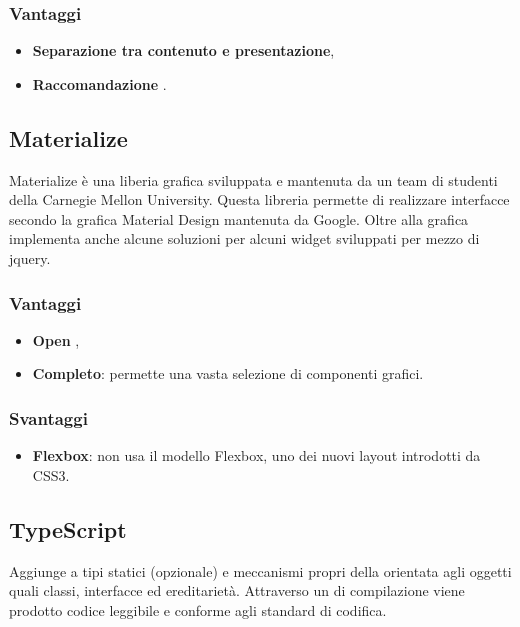 \subsubsection{Vantaggi}
\begin{itemize}
\item \textbf{Separazione tra contenuto e presentazione},
\item \textbf{Raccomandazione }.
\end{itemize}

\subsection{Materialize}
Materialize è una liberia grafica sviluppata e mantenuta da un team di studenti della Carnegie Mellon University. Questa libreria permette di realizzare interfacce secondo la grafica Material Design mantenuta da Google. Oltre alla grafica implementa anche alcune soluzioni per alcuni widget sviluppati per mezzo di jquery.
\subsubsection{Vantaggi}
\begin{itemize}
\item \textbf{Open },
\item \textbf{Completo}: permette una vasta selezione di componenti grafici.
\end{itemize}
\subsubsection{Svantaggi}
\begin{itemize}
\item \textbf{Flexbox}: non usa il modello Flexbox, uno dei nuovi layout introdotti da CSS3.
\end{itemize}

\subsection{TypeScript}
Aggiunge a  tipi statici (opzionale) e meccanismi propri della  orientata agli oggetti quali classi, interfacce ed ereditariet\`a. Attraverso un  di compilazione viene prodotto codice  leggibile e conforme agli standard di codifica. 
